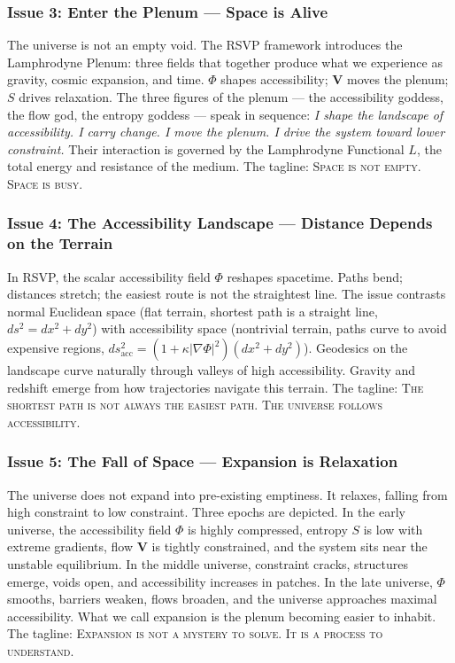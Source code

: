 \documentclass[12pt, a4paper]{article}
\begin{document}
\subsubsection{Issue 3: Enter the Plenum --- Space is Alive}

The universe is not an empty void. The RSVP framework introduces the Lamphrodyne Plenum: three fields that together produce what we experience as gravity, cosmic expansion, and time. $\Phi$ shapes accessibility; $\mathbf{V}$ moves the plenum; $S$ drives relaxation. The three figures of the plenum --- the accessibility goddess, the flow god, the entropy goddess --- speak in sequence: \textit{I shape the landscape of accessibility. I carry change. I move the plenum. I drive the system toward lower constraint.} Their interaction is governed by the Lamphrodyne Functional $L$, the total energy and resistance of the medium. The tagline: \textsc{Space is not empty. Space is busy.}

\subsubsection{Issue 4: The Accessibility Landscape --- Distance Depends on the Terrain}

In RSVP, the scalar accessibility field $\Phi$ reshapes spacetime. Paths bend; distances stretch; the easiest route is not the straightest line. The issue contrasts normal Euclidean space (flat terrain, shortest path is a straight line, $ds^2 = dx^2 + dy^2$) with accessibility space (nontrivial terrain, paths curve to avoid expensive regions, $ds^2_{\text{acc}} = (1+\kappa|\nabla\Phi|^2)(dx^2+dy^2)$). Geodesics on the landscape curve naturally through valleys of high accessibility. Gravity and redshift emerge from how trajectories navigate this terrain. The tagline: \textsc{The shortest path is not always the easiest path. The universe follows accessibility.}

\subsubsection{Issue 5: The Fall of Space --- Expansion is Relaxation}

The universe does not expand into pre-existing emptiness. It relaxes, falling from high constraint to low constraint. Three epochs are depicted. In the early universe, the accessibility field $\Phi$ is highly compressed, entropy $S$ is low with extreme gradients, flow $\mathbf{V}$ is tightly constrained, and the system sits near the unstable equilibrium. In the middle universe, constraint cracks, structures emerge, voids open, and accessibility increases in patches. In the late universe, $\Phi$ smooths, barriers weaken, flows broaden, and the universe approaches maximal accessibility. What we call expansion is the plenum becoming easier to inhabit. The tagline: \textsc{Expansion is not a mystery to solve. It is a process to understand.}
\end{document}
